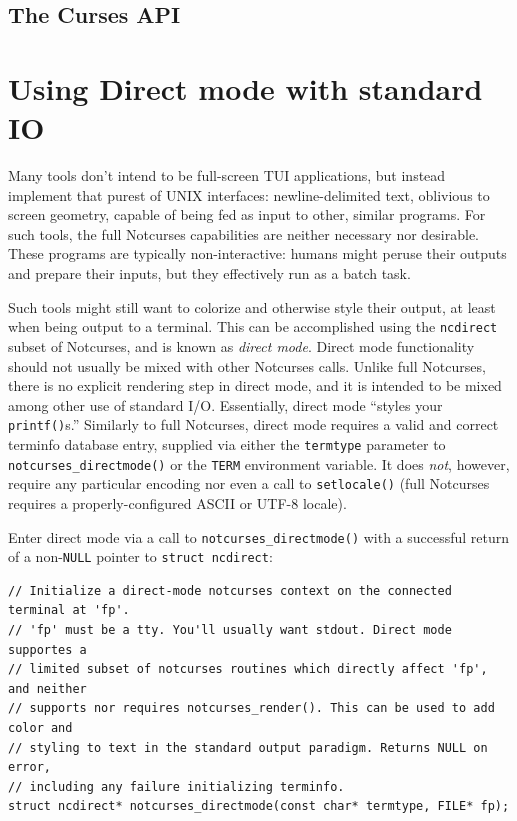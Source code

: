 \documentclass[letterpaper,10pt]{article}
\begin{document}
\subsection{The Curses API}

\newpage

\section{Using Direct mode with standard I\/O}

Many tools don't intend to be full-screen TUI applications, but instead
implement that purest of UNIX interfaces: newline-delimited text, oblivious
to screen geometry, capable of being fed as input to other, similar programs.
For such tools, the full Notcurses capabilities are neither necessary nor
desirable. These programs are typically non-interactive: humans might peruse
their outputs and prepare their inputs, but they effectively run as a batch
task.

Such tools might still want to colorize and otherwise style their output, at
least when being output to a terminal. This can be accomplished using the
\texttt{ncdirect} subset of Notcurses, and is known as \textit{direct mode}. Direct
mode functionality should not usually be mixed with other Notcurses calls.
Unlike full Notcurses, there is no explicit rendering step in direct mode, and
it is intended to be mixed among other use of standard I/O. Essentially, direct
mode ``styles your \texttt{printf()}s.'' Similarly to full Notcurses, direct mode
requires a valid and correct terminfo database entry, supplied via either the
\texttt{termtype} parameter to \texttt{notcurses\_directmode()} or the \texttt{TERM} environment
variable. It does \textit{not}, however, require any particular encoding nor
even a call to \texttt{setlocale()} (full Notcurses requires a properly-configured
ASCII or UTF-8 locale).

Enter direct mode via a call to \texttt{notcurses\_directmode()} with a successful
return of a non-\texttt{NULL} pointer to \texttt{struct ncdirect}:

\begin{listing}[ht]
\begin{verbatim}
// Initialize a direct-mode notcurses context on the connected terminal at 'fp'.
// 'fp' must be a tty. You'll usually want stdout. Direct mode supportes a
// limited subset of notcurses routines which directly affect 'fp', and neither
// supports nor requires notcurses_render(). This can be used to add color and
// styling to text in the standard output paradigm. Returns NULL on error,
// including any failure initializing terminfo.
struct ncdirect* notcurses_directmode(const char* termtype, FILE* fp);
\end{verbatim}
\end{listing}
\end{document}
